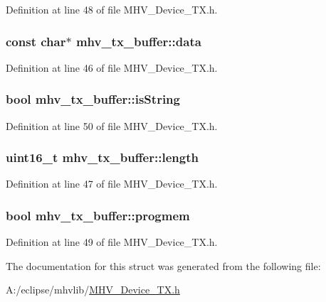 \-Definition at line 48 of file \-M\-H\-V\-\_\-\-Device\-\_\-\-T\-X.\-h.

\hypertarget{structmhv__tx__buffer_a7523481b7a0b1d4972a79a4de6e528af}{
\subsubsection[{data}]{\setlength{\rightskip}{0pt plus 5cm}const char$\ast$ {\bf mhv\-\_\-tx\-\_\-buffer\-::data}}}
\label{structmhv__tx__buffer_a7523481b7a0b1d4972a79a4de6e528af}


\-Definition at line 46 of file \-M\-H\-V\-\_\-\-Device\-\_\-\-T\-X.\-h.

\hypertarget{structmhv__tx__buffer_a945fe73e41c397f3c4f7765c97469a35}{
\subsubsection[{is\-String}]{\setlength{\rightskip}{0pt plus 5cm}bool {\bf mhv\-\_\-tx\-\_\-buffer\-::is\-String}}}
\label{structmhv__tx__buffer_a945fe73e41c397f3c4f7765c97469a35}


\-Definition at line 50 of file \-M\-H\-V\-\_\-\-Device\-\_\-\-T\-X.\-h.

\hypertarget{structmhv__tx__buffer_ac05ef0da2f6fce474bec691e8e1fb4e2}{
\subsubsection[{length}]{\setlength{\rightskip}{0pt plus 5cm}uint16\-\_\-t {\bf mhv\-\_\-tx\-\_\-buffer\-::length}}}
\label{structmhv__tx__buffer_ac05ef0da2f6fce474bec691e8e1fb4e2}


\-Definition at line 47 of file \-M\-H\-V\-\_\-\-Device\-\_\-\-T\-X.\-h.

\hypertarget{structmhv__tx__buffer_a0b9b692bdd3d83c9a53e19a5c951fb74}{
\subsubsection[{progmem}]{\setlength{\rightskip}{0pt plus 5cm}bool {\bf mhv\-\_\-tx\-\_\-buffer\-::progmem}}}
\label{structmhv__tx__buffer_a0b9b692bdd3d83c9a53e19a5c951fb74}


\-Definition at line 49 of file \-M\-H\-V\-\_\-\-Device\-\_\-\-T\-X.\-h.



\-The documentation for this struct was generated from the following file\-:\begin{DoxyCompactItemize}
\item 
\-A\-:/eclipse/mhvlib/\hyperlink{_m_h_v___device___t_x_8h}{\-M\-H\-V\-\_\-\-Device\-\_\-\-T\-X.\-h}\end{DoxyCompactItemize}

